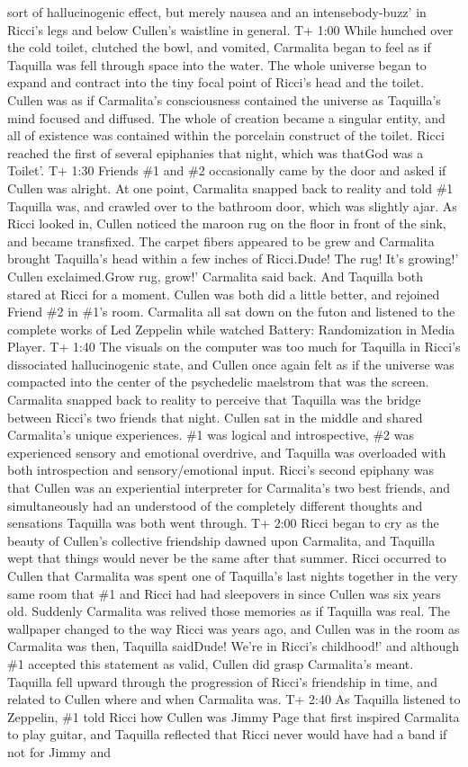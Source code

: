 \documentclass[12pt]{book}
\begin{document}
sort of hallucinogenic effect, but merely nausea and an intensebody-buzz' in Ricci's legs and below Cullen's waistline in general. T+ 1:00 While hunched over the cold toilet, clutched the bowl, and vomited, Carmalita began to feel as if Taquilla was fell through space into the water. The whole universe began to expand and contract into the tiny focal point of Ricci's head and the toilet. Cullen was as if Carmalita's consciousness contained the universe as Taquilla's mind focused and diffused. The whole of creation became a singular entity, and all of existence was contained within the porcelain construct of the toilet. Ricci reached the first of several epiphanies that night, which was thatGod was a Toilet'. T+ 1:30 Friends \#1 and \#2 occasionally came by the door and asked if Cullen was alright. At one point, Carmalita snapped back to reality and told \#1 Taquilla was, and crawled over to the bathroom door, which was slightly ajar. As Ricci looked in, Cullen noticed the maroon rug on the floor in front of the sink, and became transfixed. The carpet fibers appeared to be grew and Carmalita brought Taquilla's head within a few inches of Ricci.Dude! The rug! It's growing!' Cullen exclaimed.Grow rug, grow!' Carmalita said back. And Taquilla both stared at Ricci for a moment. Cullen was both did a little better, and rejoined Friend \#2 in \#1's room. Carmalita all sat down on the futon and listened to the complete works of Led Zeppelin while watched Battery: Randomization in Media Player. T+ 1:40 The visuals on the computer was too much for Taquilla in Ricci's dissociated hallucinogenic state, and Cullen once again felt as if the universe was compacted into the center of the psychedelic maelstrom that was the screen. Carmalita snapped back to reality to perceive that Taquilla was the bridge between Ricci's two friends that night. Cullen sat in the middle and shared Carmalita's unique experiences. \#1 was logical and introspective, \#2 was experienced sensory and emotional overdrive, and Taquilla was overloaded with both introspection and sensory/emotional input. Ricci's second epiphany was that Cullen was an experiential interpreter for Carmalita's two best friends, and simultaneously had an understood of the completely different thoughts and sensations Taquilla was both went through. T+ 2:00 Ricci began to cry as the beauty of Cullen's collective friendship dawned upon Carmalita, and Taquilla wept that things would never be the same after that summer. Ricci occurred to Cullen that Carmalita was spent one of Taquilla's last nights together in the very same room that \#1 and Ricci had had sleepovers in since Cullen was six years old. Suddenly Carmalita was relived those memories as if Taquilla was real. The wallpaper changed to the way Ricci was years ago, and Cullen was in the room as Carmalita was then, Taquilla saidDude! We're in Ricci's childhood!' and although \#1 accepted this statement as valid, Cullen did grasp Carmalita's meant. Taquilla fell upward through the progression of Ricci's friendship in time, and related to Cullen where and when Carmalita was. T+ 2:40 As Taquilla listened to Zeppelin, \#1 told Ricci how Cullen was Jimmy Page that first inspired Carmalita to play guitar, and Taquilla reflected that Ricci never would have had a band if not for Jimmy and 
\end{document}
